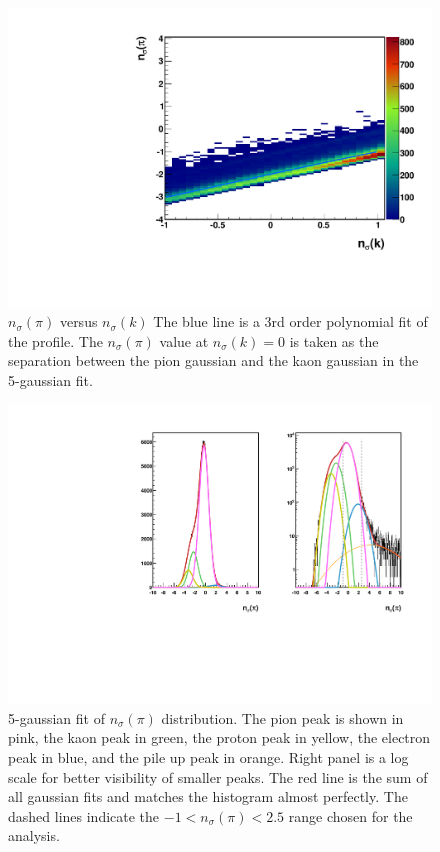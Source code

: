 \documentclass[abstract = on,listof=totoc, bibliography=totoc]{scrreprt}
\begin{document}
 \begin{figure}
\begin{center}
\includegraphics[width = .7\textwidth]{exampleNsigNsig.pdf}
\caption[$n_\sigma(\pi)$ versus $n_\sigma(k)$]{$n_\sigma(\pi)$ versus $n_\sigma(k)$ The blue line is a 3rd order polynomial fit of the profile. The $n_\sigma(\pi)$ value at $n_\sigma(k) = 0$ is taken as the separation between the pion gaussian and the kaon gaussian in the 5-gaussian fit.}
\label{fig:nSignSig}
\end{center}
\end{figure}



 \begin{figure}
\begin{center}
\includegraphics[width = 1\textwidth]{histogramExample2Fit.pdf}
\caption[5-gaussian fit of $n_\sigma(\pi)$ distribution]{5-gaussian fit of $n_\sigma(\pi)$ distribution. The pion peak is shown in pink, the kaon peak in green, the proton peak in yellow, the electron peak in blue, and the pile up peak in orange. Right panel is a log scale for better visibility of smaller peaks. The red line is the sum of all gaussian fits and matches the histogram almost perfectly. The dashed lines indicate the $-1 < n_\sigma(\pi) < 2.5$ range chosen for the analysis.}
\label{fig:nSigExampleFit}
\end{center}
\end{figure}
\end{document}
